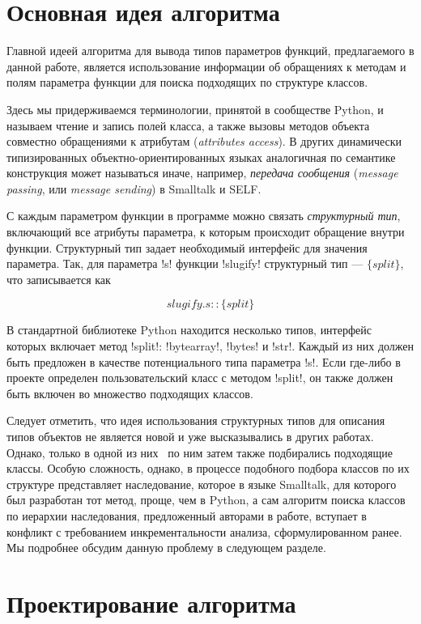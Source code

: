 \section{Основная идея алгоритма}
\label{sec:main-idea}

Главной идеей алгоритма для вывода типов параметров функций, предлагаемого в
данной работе, является использование информации об обращениях к методам и полям
параметра функции для поиска подходящих по структуре классов. 

Здесь мы придерживаемся терминологии, принятой в сообществе Python, и называем
чтение и запись полей класса, а также вызовы методов объекта совместно
обращениями к атрибутам (\emph{attributes access}). В других динамически
типизированных объектно-ориентированных языках аналогичная по семантике
конструкция может называться иначе, например, \emph{передача сообщения}
(\emph{message passing}, или \emph{message sending}) в Smalltalk и SELF.

С каждым параметром функции в программе можно связать \emph{структурный тип},
включающий все атрибуты параметра, к которым происходит обращение внутри
функции. Структурный тип задает необходимый интерфейс для значения параметра.
Так, для параметра !s! функции !slugify! структурный тип --- $\{split\}$, что
записывается как 

\[
    slugify.s :: \{ split \}
\]

В стандартной библиотеке Python находится несколько типов, интерфейс которых
включает метод !split!: !bytearray!, !bytes! и !str!. Каждый из
них должен быть предложен в качестве потенциального типа параметра !s!. Если
где-либо в проекте определен пользовательский класс с методом !split!, он также
должен быть включен во множество подходящих классов.

Следует отметить, что идея использования структурных типов для описания типов
объектов не является новой и уже высказывались в других работах.  Однако, только
в одной из них~\cite{Pluquet2009} по ним затем также подбирались подходящие
классы. Особую сложность, однако, в процессе подобного подбора классов по их
структуре представляет наследование, которое в языке Smalltalk, для которого был
разработан тот метод, проще, чем в Python, а сам алгоритм поиска классов по
иерархии наследования, предложенный авторами в работе, вступает в конфликт с
требованием инкрементальности анализа, сформулированном ранее. Мы подробнее
обсудим данную проблему в следующем разделе.

\section{Проектирование алгоритма}
\label{sec:algorithm-design}

